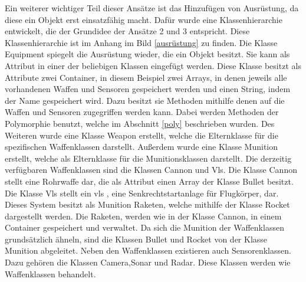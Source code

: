 Ein weiterer wichtiger Teil dieser Ansätze ist das Hinzufügen von Ausrüstung, da diese ein Objekt erst einsatzfähig macht. Dafür wurde eine Klassenhierarchie entwickelt, die der Grundidee der Ansätze 2 und 3 entspricht. Diese Klassenhierarchie ist im Anhang im Bild \ref{ausrüstung} zu finden. Die Klasse \glqq Equipment\grqq{} spiegelt die Ausrüstung wieder, die ein Objekt besitzt. Sie kann als Attribut in einer der beliebigen Klassen eingefügt werden.  Diese Klasse besitzt als Attribute zwei Container, in diesem Beispiel zwei Arrays, in denen jeweils alle vorhandenen Waffen und Sensoren gespeichert werden und einen String, indem der Name gespeichert wird.  Dazu besitzt sie Methoden mithilfe denen auf die Waffen und Sensoren zugegriffen werden kann. Dabei werden Methoden der Polymorphie benutzt, welche im Abschnitt  \ref{poly} beschrieben wurden. Des Weiteren wurde eine Klasse \glqq Weapon\grqq{} erstellt, welche die Elternklasse für die spezifischen Waffenklassen darstellt. Außerdem wurde eine Klasse \glqq Munition\grqq{} erstellt, welche als Elternklasse für die Munitionsklassen darstellt. Die derzeitig verfügbaren Waffenklassen sind die Klassen \glqq Cannon\grqq{} und \glqq Vls\grqq{}. Die Klasse \glqq Cannon\grqq{} stellt eine Rohrwaffe dar, die als Attribut einen Array der Klasse  \glqq Bullet\grqq{} besitzt. Die Klasse \glqq Vls\grqq{} stellt ein  \ac{vls} , eine Senkrechtstartanlage für Flugkörper, dar. Dieses System besitzt als Munition Raketen, welche mithilfe der Klasse \glqq Rocket\grqq{} dargestellt werden.  Die Raketen, werden wie in der Klasse \glqq Cannon\grqq{}, in einem Container gespeichert und verwaltet. Da sich die Munition der Waffenklassen grundsätzlich ähneln, sind die Klassen \glqq Bullet\grqq{} und  \glqq Rocket\grqq{}  von der Klasse  \glqq Munition\grqq{} abgeleitet. Neben den Waffenklassen existieren auch Sensorenklassen. Dazu gehören die Klassen \glqq Camera\grqq{},\glqq Sonar\grqq{} und \glqq Radar\grqq{}. Diese Klassen werden wie Waffenklassen behandelt. 
 
